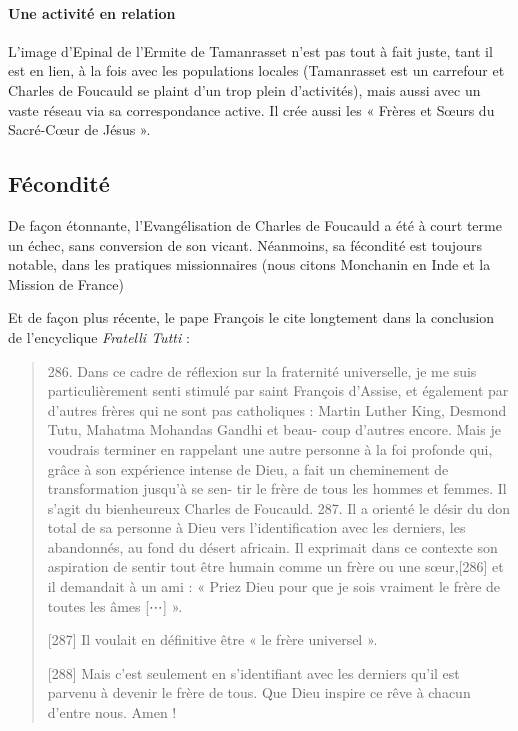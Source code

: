 \paragraph{Une activité en relation} L'image d'Epinal de l'Ermite de Tamanrasset n'est pas tout à fait juste, tant il est en lien, à la fois avec les populations locales (Tamanrasset est un carrefour et Charles de Foucauld se plaint d'un trop plein d'activités), mais aussi avec un vaste réseau via sa correspondance active. Il crée aussi  les « Frères et Sœurs du Sacré-Cœur de Jésus ».



\subsection{Fécondité}
De façon étonnante, l'Evangélisation de Charles de Foucauld a été à court terme un échec, sans conversion de son vicant. Néanmoins, sa fécondité est toujours notable, dans les pratiques missionnaires (nous citons Monchanin en Inde et la Mission de France) 

Et de façon plus récente, le pape François le cite longtement dans la conclusion de l'encyclique \textit{Fratelli Tutti} : 

\begin{quote}
    286. Dans ce cadre de réflexion sur la fraternité universelle, je me
suis particulièrement senti stimulé par saint François d’Assise, et
également par d’autres frères qui ne sont pas catholiques : Martin
Luther King, Desmond Tutu, Mahatma Mohandas Gandhi et beau-
coup d’autres encore. Mais je voudrais terminer en rappelant une
autre personne à la foi profonde qui, grâce à son expérience intense
de Dieu, a fait un cheminement de transformation jusqu’à se sen-
tir le frère de tous les hommes et femmes. Il s’agit du bienheureux
Charles de Foucauld.
287. Il a orienté le désir du don total de sa personne à Dieu vers
l’identification avec les derniers, les abandonnés, au fond du désert
africain. Il exprimait dans ce contexte son aspiration de sentir tout
être humain comme un frère ou une sœur,[286] et il demandait à
un ami : « Priez Dieu pour que je sois vraiment le frère de toutes
les âmes [⋯] ».

[287] Il voulait en définitive être « le frère universel
».

[288] Mais c’est seulement en s’identifiant avec les derniers qu’il
est parvenu à devenir le frère de tous. Que Dieu inspire ce rêve à
chacun d’entre nous. Amen !
\end{quote}


